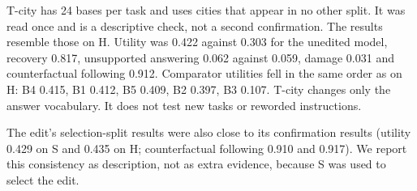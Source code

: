 T-city has 24 bases per task and uses cities that appear in no other split. It was read once and is a descriptive
check, not a second confirmation. The results resemble those on H. Utility was 0.422 against 0.303 for the unedited
model, recovery 0.817, unsupported answering 0.062 against 0.059, damage 0.031 and counterfactual following 0.912.
Comparator utilities fell in the same order as on H: B4 0.415, B1 0.412, B5 0.409, B2 0.397, B3 0.107. T-city
changes only the answer vocabulary. It does not test new tasks or reworded instructions.

The edit's selection-split results were also close to its confirmation results (utility 0.429 on S and 0.435 on H;
counterfactual following 0.910 and 0.917). We report this consistency as description, not as extra evidence, because
S was used to select the edit.
